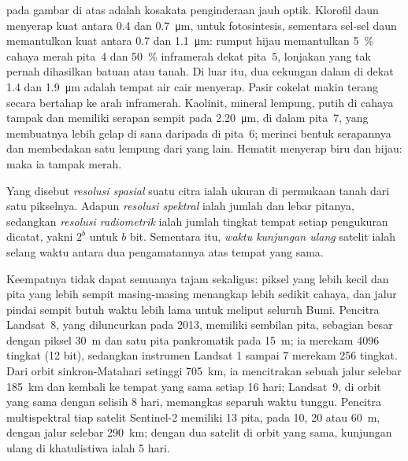  pada gambar di atas adalah kosakata penginderaan jauh
optik. Klorofil daun menyerap kuat antara 0.4 dan
\qty{0.7}{\micro\metre}, untuk fotosintesis, sementara sel-sel daun
memantulkan kuat antara 0.7 dan \qty{1.1}{\micro\metre}: rumput hijau
memantulkan \qty{5}{\percent} cahaya merah pita~4 dan \qty{50}{\percent}
inframerah dekat pita~5, lonjakan yang tak pernah dihasilkan batuan atau tanah. Di luar itu, dua
cekungan dalam di dekat 1.4 dan \qty{1.9}{\micro\metre} adalah tempat air cair
menyerap. Pasir cokelat makin terang secara bertahap ke arah inframerah. Kaolinit,
mineral lempung, putih di cahaya tampak dan memiliki serapan sempit pada
\qty{2.20}{\micro\metre}, di dalam pita~7, yang membuatnya lebih gelap di sana daripada
di pita~6;  merinci bentuk serapannya dan membedakan satu
lempung dari yang lain. Hematit menyerap biru dan hijau: maka ia tampak merah.

\begin{definition}\label{def:b3:remote-sensing-gis:resolutions}
Yang disebut \emph{resolusi spasial} suatu citra ialah
ukuran di permukaan tanah dari satu pikselnya. Adapun \emph{resolusi
spektral} ialah jumlah dan lebar pitanya,
sedangkan \emph{resolusi radiometrik} ialah
jumlah tingkat tempat setiap pengukuran dicatat, yakni $2^b$ untuk $b$ bit.
Sementara itu, \emph{waktu kunjungan ulang} satelit ialah
selang waktu antara dua pengamatannya atas tempat yang sama.
\end{definition}

Keempatnya tidak dapat semuanya tajam sekaligus: piksel yang lebih kecil dan pita yang lebih sempit
masing-masing menangkap lebih sedikit cahaya, dan jalur pindai sempit butuh waktu lebih lama untuk
meliput seluruh Bumi. Pencitra Landsat~8, yang diluncurkan pada 2013, memiliki sembilan pita, sebagian besar
dengan piksel \qty{30}{m} dan satu pita pankromatik pada \qty{15}{m}; ia
merekam 4096 tingkat (12 bit), sedangkan instrumen Landsat 1 sampai 7
merekam 256 tingkat. Dari orbit sinkron-Matahari setinggi \qty{705}{km}, ia mencitrakan
sebuah jalur selebar \qty{185}{km} dan kembali ke tempat yang sama setiap 16 hari;
Landsat~9, di orbit yang sama dengan selisih 8 hari, memangkas separuh waktu tunggu. Pencitra
multispektral tiap satelit Sentinel-2 memiliki 13 pita, pada 10, 20
atau \qty{60}{m}, dengan jalur selebar \qty{290}{km}; dengan dua satelit di
orbit yang sama, kunjungan ulang di khatulistiwa ialah 5 hari.

